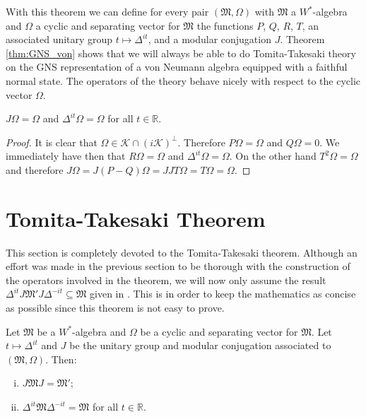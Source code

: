 With this theorem we can define for every pair $(\mathfrak{M},\Omega)$ with $\mathfrak{M}$ a $W^*$-algebra and $\Omega$ a cyclic and separating vector for $\mathfrak{M}$ the functions $P$, $Q$, $R$, $T$, an associated unitary group $t\mapsto\Delta^{it}$, and a modular conjugation $J$. Theorem \ref{thm:GNS_von} shows that we will always be able to do Tomita-Takesaki theory on the GNS representation of a von Neumann algebra equipped with a faithful normal state. The operators of the theory behave nicely with respect to the cyclic vector $\Omega$.

\begin{theorem}
$J\Omega=\Omega$ and $\Delta^{it}\Omega=\Omega$ for all $t\in\mathbb{R}$.
\end{theorem}

\begin{proof}
It is clear that $\Omega\in\mathcal{K}\cap(i\mathcal{K})^\bot$. Therefore $P\Omega=\Omega$ and $Q\Omega = 0$. We immediately have then that $R\Omega = \Omega$ and $\Delta^{it}\Omega=\Omega$. On the other hand $T^2\Omega=\Omega$ and therefore $J\Omega = J(P-Q)\Omega=JJT\Omega = T\Omega =\Omega$.
\end{proof}

\section{Tomita-Takesaki Theorem}

This section is completely devoted to the Tomita-Takesaki theorem. Although an effort was made in the previous section to be thorough with the construction of the operators involved in the theorem, we will now only assume the result $\Delta^{it}J\mathfrak{M}'J\Delta^{-it}\subseteq \mathfrak{M}$ given in \cite{Duvenhage1999}\cite{Rieffel1977}. This is in order to keep the mathematics as concise as possible since this theorem is not easy to prove.

\begin{theorem}\label{thm:Tomita-Takesaki}
Let $\mathfrak{M}$ be a $W^*$-algebra and $\Omega$ be a cyclic and separating vector for $\mathfrak{M}$. Let $t\mapsto\Delta^{it}$ and $J$ be the unitary group and modular conjugation associated to $(\mathfrak{M},\Omega)$. Then:
\begin{enumerate}[(i)]

\item $J\mathfrak{M}J=\mathfrak{M}'$;

\item $\Delta^{it}\mathfrak{M}\Delta^{-it}=\mathfrak{M}$ for all $t\in\mathbb{R}$. 

\end{enumerate}
\end{theorem}

